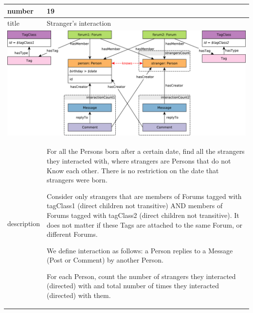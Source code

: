 \renewcommand*{\arraystretch}{1.5}
\noindent\begin{tabularx}{17cm}{|p{1.95cm}|X|}
	\hline
	number      & 19                                                          \\ \hline
	title       & Stranger's interaction                                                           \\ \hline
	\multicolumn{2}{|c|}{ \includegraphics[scale=\patternscale,margin=0cm .2cm]{patterns/q19}} \\ \hline
	description & For all the Persons born after a certain date, find all the strangers
they interacted with, where strangers are Persons that do not Know each
other. There is no restriction on the date that strangers were born.

Consider only strangers that are members of Forums tagged with tagClass1
(direct children not transitive) AND members of Forums tagged with
tagClass2 (direct children not transitive). It does not matter if these
Tags are attached to the same Forum, or different Forums.

We define interaction as follows: a Person replies to a Message (Post or
Comment) by another Person.

For each Person, count the number of strangers they interacted
(directed) with and total number of times they interacted (directed)
with them.
 \\ \hline
	

\end{tabularx}
